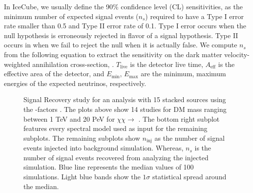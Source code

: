 In IceCube, we usually define the 90\% confidence level (CL) sensitivities, as the minimum number of expected signal events ($n_s$) required to have a Type I error rate smaller than 0.5 and Type II error rate of 0.1.
Type I error occurs when the null hypothesis is erroneously rejected in flavor of a signal hypothesis.
Type II occurs in when we fail to reject the null when it is actually false.
We compute  $n_s$ from the following equation
\svFromNSig
to extract the sensitivity on the dark matter velocity-weighted annihilation cross-section, \sv.
$T_\mathrm{live} $ is the detector live time, $ A_\mathrm{eff} $ is the effective area of the detector, and $ E_\mathrm{min} $, $ E_\mathrm{max} $ are the minimum, maximum energies of the expected neutrinos, respectively.

\begin{figure}[t]
    \caption{Signal Recovery study for an analysis with 15 stacked sources using the \GS \J-factors \cite{Geringer_Sameth_2015}. The plots above show 14 studies for DM mass ranging between 1 TeV and 20 PeV for $\chi\chi \rightarrow$ \parpar{\nu_\mu}. The bottom right subplot features every spectral model used as input for the remaining subplots. The remaining subplots show $n_\mathrm{inj}$ as the number of signal events injected into background simulation. Whereas, $n_s$ is the number of signal events recovered from analyzing the injected simulation. Blue line represents the median values of 100 simulations. Light blue bands show the $1\sigma$ statistical spread around the median.}
    \label{fig:icDM_sigrecovery_1of2}
\end{figure}

